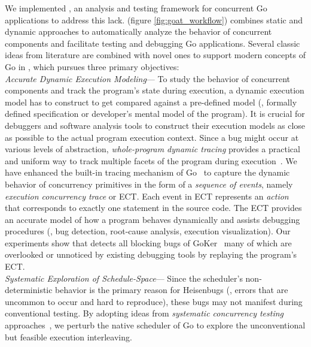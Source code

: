 We implemented \goat, an analysis and testing framework for concurrent Go applications to address this lack.
%
\goat (figure \ref{fig:goat_workflow}) combines static and dynamic approaches to automatically analyze the behavior of concurrent components and facilitate testing and debugging Go applications.
%
Several classic ideas from literature are combined with novel ones to support modern concepts of Go in \goat, which pursues three primary objectives:
\\
 \textit{Accurate Dynamic Execution Modeling}---
To study the behavior of concurrent components and track the program's state during execution, a dynamic execution model has to construct to get compared against a pre-defined model (\eg, formally defined specification or developer's mental model of the program).
%
It is crucial for debuggers and software analysis tools to construct their execution models as close as possible to the actual program execution context.
%
Since a bug might occur at various levels of abstraction, \textit{whole-program dynamic tracing} provides a practical and uniform way to track multiple facets of the program during execution~\cite{difftrace}.
%
We have enhanced the built-in tracing mechanism of Go~\cite{ect-arxiv} to capture the dynamic behavior of concurrency primitives in the form of a \textit{sequence of events}, namely \textit{execution concurrency trace} or ECT.
%
Each event in ECT represents an \textit{action} that corresponds to exactly one statement in the source code.
%
The ECT provides an accurate model of how a program behaves dynamically and assists debugging procedures (\eg, bug detection, root-cause analysis, execution visualization).
%
Our experiments show that \goat detects all blocking bugs of GoKer~\cite{yuan-gobench-cgo21} many of which are overlooked or unnoticed by existing debugging tools by replaying the program's ECT.
\\
 \textit{Systematic Exploration of Schedule-Space}---
Since the scheduler's non-deterministic behavior is the primary reason for Heisenbugs (\ie, errors that are uncommon to occur and hard to reproduce), these bugs may not manifest during conventional testing.
%
By adopting ideas from \textit{systematic concurrency testing} approaches~\cite{dpor,thomson-concurrencyTesting-ppopp14,emmi-delayBounded-popl11,burckhardt-depthBug-asplos10,madanlal-preemptionBound-pldi07,yu-maple-oopsla12,joshi-calfuzzer,contest-jgi01,edelstein2003contest,hong-syncTesting-issta12,christakis-erlang-icst13,yuan-morpheus-asplos20}, we perturb the native scheduler of Go to explore the unconventional but feasible execution interleaving.
